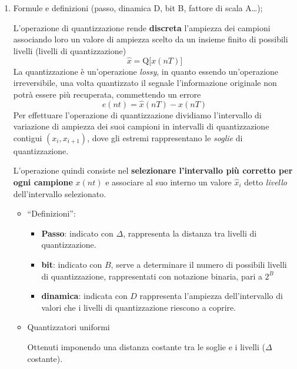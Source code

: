 \documentclass[
]{article}
\providecommand{\tightlist}{%
  \setlength{\itemsep}{0pt}\setlength{\parskip}{0pt}}
\begin{document}
\begin{enumerate}
\def\labelenumi{\arabic{enumi}.}
\setcounter{enumi}{29}
\item
  Formule e definizioni (passo, dinamica D, bit B, fattore di scala
  A\ldots);

  L'operazione di quantizzazione rende \textbf{discreta} l'ampiezza dei
  campioni associando loro un valore di ampiezza scelto da un insieme
  finito di possibili livelli (livelli di quantizzazione) \[
  \hat{x} = \text{Q}\Big[x(nT)\Big]
  \] La quantizzazione è un'operazione \emph{lossy}, in quanto essendo
  un'operazione irreversibile, una volta quantizzato il segnale
  l'informazione originale non potrà essere più recuperata, commettendo
  un errore \[
  e(nt)=\hat{x}(nT)-x(nT)
  \] Per effettuare l'operazione di quantizzazione dividiamo
  l'intervallo di variazione di ampiezza dei suoi campioni in intervalli
  di quantizzazione contigui \((x_i, x_{i+1})\), dove gli estremi
  rappresentano le \emph{soglie} di quantizzazione.

  L'operazione quindi consiste nel \textbf{selezionare l'intervallo più
  corretto per ogni campione} \(x(nt)\) e associare al suo interno un
  valore \(\hat{x}_i\) detto \emph{livello} dell'intervallo selezionato.

  \begin{itemize}
  \item
    ``Definizioni'':

    \begin{itemize}
    \tightlist
    \item
      \textbf{Passo}: indicato con \(\Delta\), rappresenta la distanza
      tra livelli di quantizzazione.
    \item
      \textbf{bit}: indicato con \(B\), serve a determinare il numero di
      possibili livelli di quantizzazione, rappresentati con notazione
      binaria, pari a \(2^{B}\)
    \item
      \textbf{dinamica}: indicata con \(D\) rappresenta l'ampiezza
      dell'intervallo di valori che i livelli di quantizzazione riescono
      a coprire.
    \end{itemize}
  \item
    Quantizzatori uniformi

    Ottenuti imponendo una distanza costante tra le soglie e i livelli
    (\(\Delta\) costante).


\end{itemize}
\end{enumerate}
\end{document}
